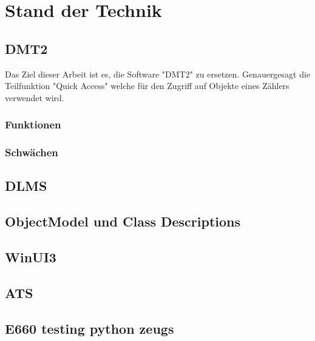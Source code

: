 \chapter{Stand der Technik}

\section{DMT2}
Das Ziel dieser Arbeit ist es, die Software "DMT2" zu ersetzen. Genauergesagt die Teilfunktion "Quick Access" welche für den Zugriff auf Objekte eines Zählers verwendet wird.

\subsection{Funktionen}

\subsection{Schwächen}


\section{DLMS}

\section{ObjectModel und Class Descriptions}

\section{WinUI3}

\section{ATS}

\section{E660 testing python zeugs}